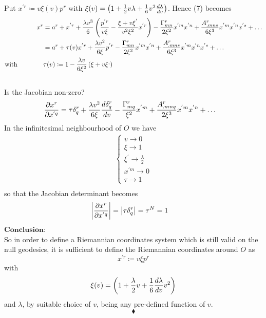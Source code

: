 Put $x^{'r} \coloneqq   v\xi(v) p^r$ with $\xi(v) = \left(1  + \frac{1}{2} v\lambda  +\frac{1}{6}v^2\dv{\lambda  }{v}\right)$. Hence (7) becomes
\begin{align}
\ x^r &= a^r + x^{'r} + \frac{\lambda v^3}{6}  \left( \frac{p^{'r}}{v\xi} - \frac{\xi + v\xi^{'}}{v^2\xi^2}x^{'r}\right)  -  \frac{\Gamma^r_{mn}}{2\xi ^2}x^{'m}x^{'n} + \frac{A^r_{.mns}}{6\xi ^3}x^{'m}x^{'n}x^{'s}+\dots\\
\ & = a^r + \tau(v) x^{'r}+ \frac{\lambda v^2 }{6\xi}p^{'r} -  \frac{\Gamma^r_{mn}}{2\xi ^2}x^{'m}x^{'n}   + \frac{A^r_{.mns}}{6\xi ^3}x^{'m}x^{'n}x^{'s}+\dots\\
\text{with}\quad\quad\quad\quad & \tau(v)  \coloneqq 1-\frac{\lambda v}{6\xi^2}\left( \xi + v\xi^{,}\right)
\end{align}\\
Is the Jacobian non-zero?
\begin{align}
\pdv{x^r}{x^{'q}}  & = \tau\delta^r_q+ \frac{\lambda  v^2}{6\xi}\dv{\delta^r_q}{v} -  \frac{\Gamma^r_{mq}}{\xi ^2}x^{'m}   + \frac{A^r_{.mnq}}{2\xi ^3}x^{'m}x^{'n}+\dots
\end{align}
In the infinitesimal neighbourhood of $O$ we have \\
\begin{align}\left \{ \begin{array}{l} 
v \rightarrow 0\\  
\xi \rightarrow 1\\
\xi^{'} \rightarrow \frac{\lambda }{2}\\ 
x^{'m} \rightarrow 0\\
\tau \rightarrow 1 
\end{array} \right.\\
\end{align}
so that the Jacobian determinant becomes
\begin{align}
\left| \pdv{x^r}{x^{'q}} \right| &= \left| \tau\delta^r_q \right| =\tau ^N = 1
\end{align}
$\textbf{Conclusion:}$\\
So in order to define a Riemannian coordinates system which is still valid on the null geodesics, it is sufficient to define the Riemannian coordinates around $O$ as $$ x^{'r} \coloneqq   v\xi p^r$$ with $$\xi(v) = \left(1  + \frac{\lambda}{2} v +\frac{1}{6}\dv{\lambda }{v} v^2\right) $$
and $\lambda $, by suitable choice of $v$, being any pre-defined function of $v$.
$$\blacklozenge$$
\newpage

